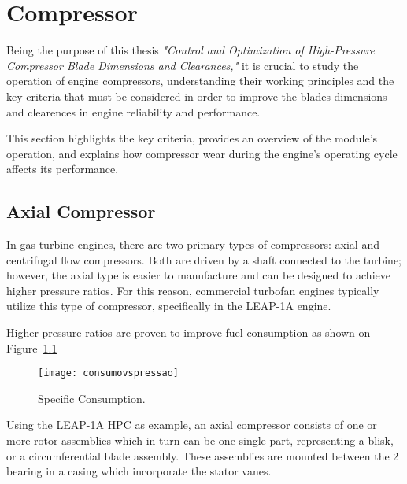 
%

\chapter{Compressor}
\label{cha:compressor}

Being the purpose of this thesis \textit{"Control and Optimization of High-Pressure Compressor Blade Dimensions and Clearances,"} it is crucial to study the operation of engine compressors, understanding their working principles and the key criteria that must be considered in order to improve the blades dimensions and clearences in engine reliability and performance.

This section highlights the key criteria, provides an overview of the module's operation, and explains how compressor wear during the engine's operating cycle affects its performance.

\section{Axial Compressor}
\label{sec:axial_compressor}

In gas turbine engines, there are two primary types of compressors: axial and centrifugal flow compressors. Both are driven by a shaft connected to the turbine; however, the axial type is easier to manufacture and can be designed to achieve higher pressure ratios. For this reason, commercial turbofan engines typically utilize this type of compressor, specifically in the \gls{LEAP}-1A engine. 

Higher pressure ratios are proven to improve fuel consumption as shown on Figure~\ref{fig:consumovspressao}

\begin{figure}[H]
    \centering
    \texttt{[image: consumovspressao]}
    \caption{Specific Consumption.\cite{RollsRoyce}}
    \label{fig:consumovspressao}
\end{figure}


Using the \gls{LEAP}-1A \gls{HPC} as example, an axial compressor consists of one or more rotor assemblies which in turn can be one single part, representing a blisk, or a circumferential blade assembly. These assemblies are mounted between the 2 bearing in a casing which incorporate the stator vanes.

